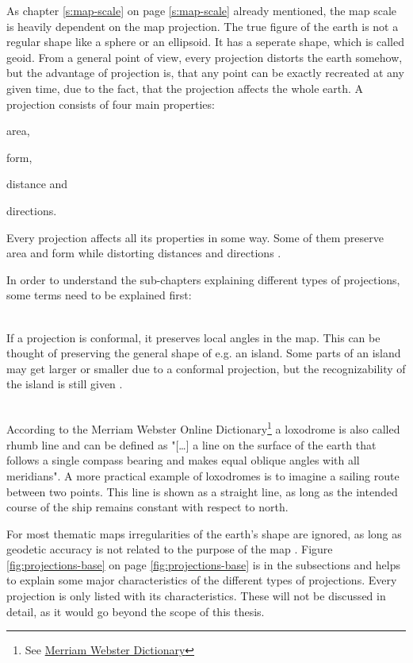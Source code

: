 As chapter \ref{s:map-scale} on page \ref{s:map-scale} already mentioned, the map scale is heavily dependent on the map projection. The true figure of the earth is not a regular shape like a sphere or an ellipsoid. It has a seperate shape, which is called geoid.
From a general point of view, every projection distorts the earth somehow, but the advantage of projection is, that any point can be exactly recreated at any given time, due to the fact, that the projection affects the whole earth.
A projection consists of four main properties:
\begin{enumerate*}
\item area,
\item form,
\item distance and
\item directions.
\end{enumerate*}
Every projection affects all its properties in some way. Some of them preserve area and form while distorting distances and directions .

In order to understand the sub-chapters explaining different types of projections, some terms need to be explained first:

\begin{enumerate}

 \hfill \\
If a projection is conformal, it preserves local angles in the map. This can be thought of preserving the general shape of e.g. an island. Some parts of an island may get larger or smaller due to a conformal projection, but the recognizability of the island is still given .

 \hfill \\
According to the Merriam Webster Online Dictionary\footnote{See \href{http://www.merriam-webster.com/}{Merriam Webster Dictionary}} a loxodrome is also called rhumb line and can be defined as "[\ldots] a line on the surface of the earth that follows a single compass bearing and makes equal oblique angles with all meridians". A more practical example of loxodromes is to imagine a sailing route between two points. This line is shown as a straight line, as long as the intended course of the ship remains constant with respect to north.

\end{enumerate}

For most thematic maps irregularities of the earth's shape are ignored, as long as geodetic accuracy is not related to the purpose of the map . Figure \ref{fig:projections-base} on page \ref{fig:projections-base} is in the subsections and helps to explain some major characteristics of the different types of projections. Every projection is only listed with its characteristics. These will not be discussed in detail, as it would go beyond the scope of this thesis.

